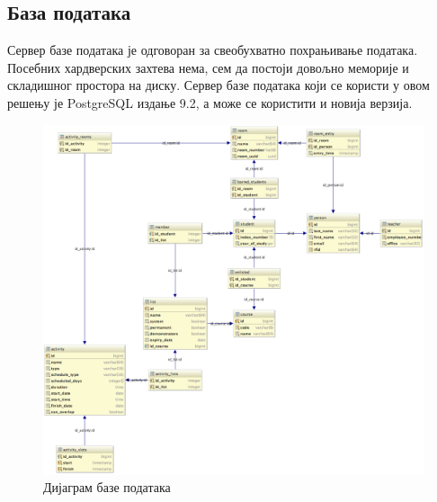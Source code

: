 \documentclass[a4paper, 12pt, diplomski]{etfcyr}
\begin{document}
			\subsection{База података}
				\begin{justify}
					Сервер базе података је одговоран за свеобухватно похрањивање података. Посебних хардверских захтева нема, сем да постоји довољно меморије и складишног простора на диску. Сервер базе података који се користи у овом решењу је PostgreSQL издање 9.2, а може се користити и новија верзија.
					\begin{figure}[h]
						\begin{center}
							\includegraphics[scale=0.25]{DatabaseDiagram.png}
						\end{center}
						\caption{Дијаграм базе података}
						\label{figure:2}
					\end{figure}
				\end{justify}
				
\end{document}
